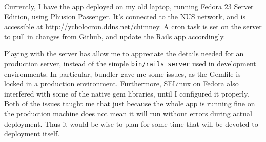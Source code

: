 \documentclass[12pt, notitlepage]{article}
\begin{document}
Currently, I have the app deployed on my old laptop, running Fedora 23 Server Edition, using Phusion Passenger. It's connected to the NUS network, and is accessible at \url{http://ycholocron.ddns.net/chimney}. A cron task is set on the server to pull in changes from Github, and update the Rails app accordingly.

Playing with the server has allow me to appreciate the details needed for an production server, instead of the simple \texttt{bin/rails server} used in development environments. In particular, bundler gave me some issues, as the Gemfile is locked in a production environment. Furthermore, SELinux on Fedora also interfered with some of the native gem libraries, until I configured it properly. Both of the issues taught me that just because the whole app is running fine on the production
machine does not mean it will run without errors during actual deployment. Thus it would be wise to plan for some time that will be devoted to deployment itself.
\end{document}
